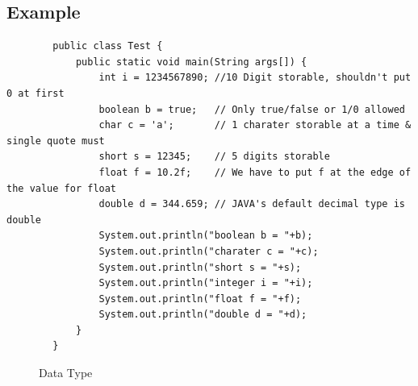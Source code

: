 \documentclass[A4 paper,openany]{book}  %
\begin{document}
\subsection{Example}
\begin{center}
    \begin{verbatim}
        public class Test {
            public static void main(String args[]) {
                int i = 1234567890; //10 Digit storable, shouldn't put 0 at first
                boolean b = true;   // Only true/false or 1/0 allowed
                char c = 'a';       // 1 charater storable at a time & single quote must
                short s = 12345;    // 5 digits storable
                float f = 10.2f;    // We have to put f at the edge of the value for float
                double d = 344.659; // JAVA's default decimal type is double
                System.out.println("boolean b = "+b);
                System.out.println("charater c = "+c);
                System.out.println("short s = "+s);
                System.out.println("integer i = "+i);
                System.out.println("float f = "+f);
                System.out.println("double d = "+d);
            }
        }
    \end{verbatim}
\end{center}
% 
% 
\begin{figure}[htbp]
    \begin{center}
        \caption{Data Type\cite{Ref3}}
    \end{center}
\end{figure}

% 
% 
\end{document}
